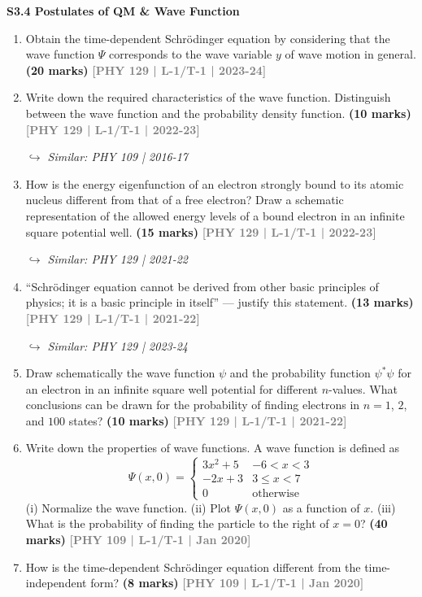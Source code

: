 \documentclass[12pt,a3paper]{article}
\newcommand{\yr}[1]{\hfill\textcolor{gray}{\small\textbf{[#1]}}}
\newcommand{\mk}[1]{\textcolor{orange!70!black}{\small\textbf{(#1 marks)}}}
\newcommand{\variant}[1]{\par\vspace{1pt}\textcolor{blue!50!black}%
  {\footnotesize\textit{$\hookrightarrow$ Similar: #1}}}
\newcommand{\subtopic}[2]{%
  \vspace{10pt}
  \noindent\begin{tcolorbox}[colback=#1!8,colframe=#1,boxrule=0.6pt,arc=4pt,
    left=6pt,right=6pt,top=4pt,bottom=4pt]
    \small\bfseries\textcolor{#1}{#2}
  \end{tcolorbox}
  \vspace{2pt}
}
\begin{document}
\label{sec:s34}
\subtopic{cA}{S3.4 \quad Postulates of QM \& Wave Function}

\begin{enumerate}

\item Obtain the time-dependent Schrödinger equation by considering that the wave function $\Psi$ corresponds to the wave variable $y$ of wave motion in general.
\mk{20} \yr{PHY 129 | L-1/T-1 | 2023-24}

\item Write down the required characteristics of the wave function. Distinguish between the wave function and the probability density function.
\mk{10} \yr{PHY 129 | L-1/T-1 | 2022-23}
\variant{PHY 109 | 2016-17}

\item How is the energy eigenfunction of an electron strongly bound to its atomic nucleus different from that of a free electron? Draw a schematic representation of the allowed energy levels of a bound electron in an infinite square potential well.
\mk{15} \yr{PHY 129 | L-1/T-1 | 2022-23}
\variant{PHY 129 | 2021-22}

\item ``Schrödinger equation cannot be derived from other basic principles of physics; it is a basic principle in itself'' --- justify this statement.
\mk{13} \yr{PHY 129 | L-1/T-1 | 2021-22}
\variant{PHY 129 | 2023-24}

\item Draw schematically the wave function $\psi$ and the probability function $\psi^*\psi$ for an electron in an infinite square well potential for different $n$-values. What conclusions can be drawn for the probability of finding electrons in $n = 1$, $2$, and $100$ states?
\mk{10} \yr{PHY 129 | L-1/T-1 | 2021-22}

\item Write down the properties of wave functions. A wave function is defined as
\[
  \Psi(x,0) = \begin{cases} 3x^2 + 5 & -6 < x < 3 \\ -2x + 3 & 3 \leq x < 7 \\ 0 & \text{otherwise} \end{cases}
\]
(i) Normalize the wave function. (ii) Plot $\Psi(x,0)$ as a function of $x$. (iii) What is the probability of finding the particle to the right of $x = 0$?
\mk{40} \yr{PHY 109 | L-1/T-1 | Jan 2020}

\item How is the time-dependent Schr\"odinger equation different from the time-independent form?
\mk{8} \yr{PHY 109 | L-1/T-1 | Jan 2020}


\end{enumerate}
\end{document}
